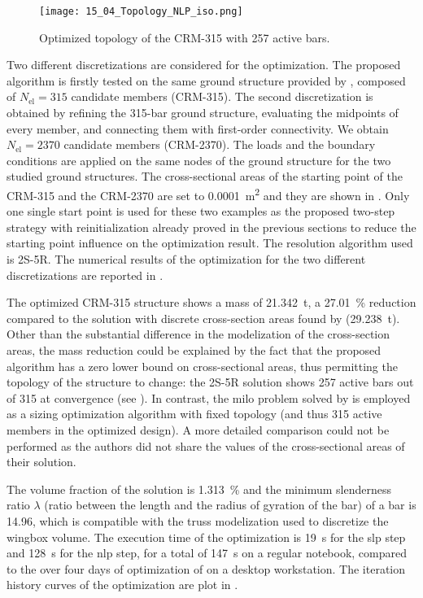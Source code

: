     \begin{figure}
        \centering
        \texttt{[image: 15\_04\_Topology\_NLP\_iso.png]}
         \caption{Optimized topology of the CRM-315 with 257 active bars.}
        \label{fig:crm315}
    \end{figure}
    
    Two different discretizations are considered for the optimization. The proposed algorithm is firstly tested on the same ground structure provided by \cite{fakhimi_discrete_2021}, composed of $N_{\text{el}}=315$ candidate members (CRM-315). The second discretization is obtained by refining the 315-bar ground structure, evaluating the midpoints of every member, and connecting them with first-order connectivity. We obtain $N_{\text{el}}=2370$ candidate members (CRM-2370). The loads and the boundary conditions are applied on the same nodes of the ground structure for the two studied ground structures. The cross-sectional areas of the starting point of the CRM-315 and the CRM-2370 are set to \qty{0.0001}{m^2} and they are shown in . Only one single start point is used for these two examples as the proposed two-step strategy with reinitialization already proved in the previous sections to reduce the starting point influence on the optimization result. The resolution algorithm used is 2S-5R. The numerical results of the optimization for the two different discretizations are reported in . 
    
    The optimized CRM-315 structure shows a mass of \qty{21.342}{\tonne}, a \qty{27.01}{\%} reduction compared to the solution with discrete cross-section areas found by \cite{fakhimi_discrete_2021}  (\qty{29.238}{\tonne}). Other than the substantial difference in the modelization of the cross-section areas, the mass reduction could be explained by the fact that the proposed algorithm has a zero lower bound on cross-sectional areas, thus permitting the topology of the structure to change: the 2S-5R solution shows 257 active bars out of 315 at convergence (see ). In contrast, the \gls{milo} problem solved by \cite{fakhimi_discrete_2021} is employed as a sizing optimization algorithm with fixed topology (and thus 315 active members in the optimized design). A more detailed comparison could not be performed as the authors did not share the values of the cross-sectional areas of their solution. 
    
    The volume fraction of the solution is \qty{1.313}{\percent} and the minimum slenderness ratio $\lambda$ (ratio between the length and the radius of gyration of the bar) of a bar is 14.96, which is compatible with the truss modelization used to discretize the wingbox volume. The execution time of the optimization is \qty{19}{s} for the \gls{slp} step and \qty{128}{s} for the \gls{nlp} step, for a total of \qty{147}{s} on a regular notebook, compared to the over four days of optimization of \cite{fakhimi_discrete_2021} on a desktop workstation. The iteration history curves of the optimization are plot in .

